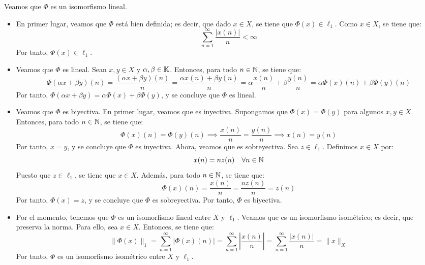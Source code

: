 \begin{ejercicio}
Veamos que $\Phi$ es un isomorfismo lineal.
\begin{itemize}
    \item En primer lugar, veamos que $\Phi$ está bien definida; es decir, que dado $x \in X$, se tiene que $\Phi(x) \in \ell_1$. Como $x \in X$, se tiene que:
    \begin{equation*}
        \sum_{n=1}^\infty \frac{|x(n)|}{n} < \infty
    \end{equation*}
    Por tanto, $\Phi(x) \in \ell_1$.
    \item Veamos que $\Phi$ es lineal. Sean $x, y \in X$ y $\alpha, \beta \in \mathbb{K}$. Entonces, para todo $n \in \mathbb{N}$, se tiene que:
    \begin{equation*}
        \Phi(\alpha x + \beta y)(n) = \frac{(\alpha x + \beta y)(n)}{n} = \frac{\alpha x(n) + \beta y(n)}{n} = \alpha \frac{x(n)}{n} + \beta \frac{y(n)}{n} = \alpha \Phi(x)(n) + \beta \Phi(y)(n)
    \end{equation*}
    Por tanto, $\Phi(\alpha x + \beta y) = \alpha \Phi(x) + \beta \Phi(y)$, y se concluye que $\Phi$ es lineal.
    \item Veamos que $\Phi$ es biyectiva. En primer lugar, veamos que es inyectiva. Supongamos que $\Phi(x) = \Phi(y)$ para algunos $x, y \in X$. Entonces, para todo $n \in \mathbb{N}$, se tiene que:
    \begin{equation*}
        \Phi(x)(n) = \Phi(y)(n) \implies \frac{x(n)}{n} = \frac{y(n)}{n} \implies x(n) = y(n)
    \end{equation*}
    Por tanto, $x = y$, y se concluye que $\Phi$ es inyectiva. Ahora, veamos que es sobreyectiva. Sea $z \in \ell_1$. Definimos $x \in X$ por:
    \begin{equation*}
        x(n) = n z(n) \quad \forall n \in \mathbb{N}
    \end{equation*}
    Puesto que $z \in \ell_1$, se tiene que $x\in X$. Además, para todo $n \in \mathbb{N}$, se tiene que:
    \begin{equation*}
        \Phi(x)(n) = \frac{x(n)}{n} = \frac{n z(n)}{n} = z(n)
    \end{equation*}
    Por tanto, $\Phi(x) = z$, y se concluye que $\Phi$ es sobreyectiva. Por tanto, $\Phi$ es biyectiva.
    \item Por el momento, tenemos que $\Phi$ es un isomorfismo lineal entre $X$ y $\ell_1$. Veamos que es un isomorfismo isométrico; es decir, que preserva la norma. Para ello, sea $x \in X$. Entonces, se tiene que:
    \begin{equation*}
        \|\Phi(x)\|_{1} = \sum_{n=1}^\infty |\Phi(x)(n)| = \sum_{n=1}^\infty \left|\frac{x(n)}{n}\right| = \sum_{n=1}^\infty \frac{|x(n)|}{n} = \|x\|_X
    \end{equation*}
    Por tanto, $\Phi$ es un isomorfismo isométrico entre $X$ y $\ell_1$.
\end{itemize}


\end{ejercicio}
